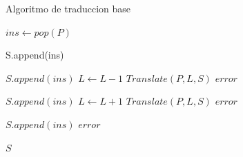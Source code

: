 \newpage
\begin{algorithm}
    \caption{Algoritmo de traduccion base}\label{euclid}
    \begin{algorithmic}[1]
    \State $ins \gets pop(P)$

    \State S.append(ins)
    \EndIf

            \State $S.append(\textit{ins})$
            \State $L \gets L-1$
            \State $Translate(P, L, S)$
        \Else
            \State \Return $error$
        \EndIf
    \EndIf
    
            \State $S.append(\textit{ins})$
            \State $L \gets L+1$
            \State $Translate(P, L, S)$
        \Else
            \State \Return $error$
        \EndIf
    \EndIf

            \State $S.append(\textit{ins})$
        \Else
            \State \Return $error$
        \EndIf
    \EndIf

    \State {}
    \State \Return $S$
    \EndProcedure
    \end{algorithmic}
    \end{algorithm}
    




    

\newpage